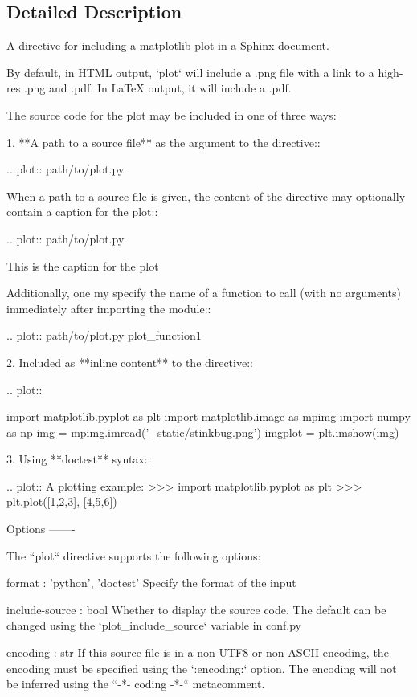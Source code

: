 \subsection{Detailed Description}
\begin{DoxyVerb}A directive for including a matplotlib plot in a Sphinx document.

By default, in HTML output, `plot` will include a .png file with a
link to a high-res .png and .pdf.  In LaTeX output, it will include a
.pdf.

The source code for the plot may be included in one of three ways:

  1. **A path to a source file** as the argument to the directive::

       .. plot:: path/to/plot.py

     When a path to a source file is given, the content of the
     directive may optionally contain a caption for the plot::

       .. plot:: path/to/plot.py

  This is the caption for the plot

     Additionally, one my specify the name of a function to call (with
     no arguments) immediately after importing the module::

       .. plot:: path/to/plot.py plot_function1

  2. Included as **inline content** to the directive::

       .. plot::

  import matplotlib.pyplot as plt
  import matplotlib.image as mpimg
  import numpy as np
  img = mpimg.imread('_static/stinkbug.png')
  imgplot = plt.imshow(img)

  3. Using **doctest** syntax::

       .. plot::
  A plotting example:
  >>> import matplotlib.pyplot as plt
  >>> plt.plot([1,2,3], [4,5,6])

Options
-------

The ``plot`` directive supports the following options:

    format : {'python', 'doctest'}
Specify the format of the input

    include-source : bool
Whether to display the source code. The default can be changed
using the `plot_include_source` variable in conf.py

    encoding : str
If this source file is in a non-UTF8 or non-ASCII encoding,
the encoding must be specified using the `:encoding:` option.
The encoding will not be inferred using the ``-*- coding -*-``
metacomment.


\end{DoxyVerb}
